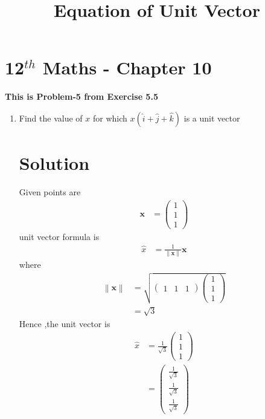\documentclass[12pt]{article}
\providecommand{\norm}[1]{\left\lVert#1\right\rVert}
\newcommand{\myvec}[1]{\ensuremath{\begin{pmatrix}#1\end{pmatrix}}}
\let\vec\mathbf
\begin{document}
\begin{center}
\title{\textbf{Equation  of Unit Vector}}
\date{\vspace{-5ex}} %
\maketitle
\end{center}
\setcounter{page}{1}
\section{12$^{th}$ Maths - Chapter 10}
\textbf{This is Problem-5 from Exercise 5.5}
\begin{enumerate}
\item Find the value of $x$ for which $x(\hat{i}+\hat{j}+\hat{k})$ is a unit vector
\section{Solution}
Given points are
\begin{align} 
\vec{x}&=\myvec{1\\1\\1}
\end{align}
unit vector formula is
\begin{align}
\hat{x}  &=\frac{1}{\norm{\vec{x}}}\vec{x}
\end{align}
where
\begin{align}
\norm{\vec{x}}&=\sqrt{\myvec{1& 1& 1}\myvec{1\\1\\1}}\\
&=\sqrt{3}
\end{align}
Hence ,the unit vector is
\begin{align}
\hat{x}&=\frac{1}{\sqrt{3}}\myvec{1\\1\\1}\\
&=\myvec{\frac{1}{\sqrt{3}}\\[2pt] \frac{1}{\sqrt{3}}\\[2pt] \frac{1}{\sqrt{3}}}
\end{align}	  
\end{enumerate} 
\end{document}

